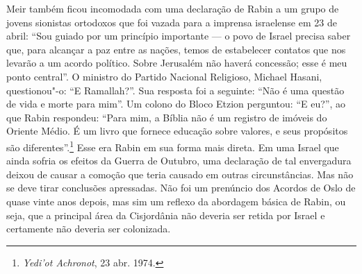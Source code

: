 Meir também ficou incomodada com uma declaração de Rabin a um grupo de
jovens sionistas ortodoxos que foi vazada para a imprensa israelense em
23 de abril: ``Sou guiado por um princípio importante --- o povo de
Israel precisa saber que, para alcançar a paz entre as nações, temos de
estabelecer contatos que nos levarão a um acordo político. Sobre
Jerusalém não haverá concessão; esse é meu ponto central''. O ministro do Partido Nacional Religioso, Michael Hasani, questionou"-o:
``E Ramallah?''. Sua resposta foi a seguinte: ``Não é uma questão de vida e morte para
mim''. Um colono do Bloco Etzion perguntou: ``E eu?'', ao que Rabin
respondeu: ``Para mim, a Bíblia não é um registro de imóveis do Oriente
Médio. É um livro que fornece educação sobre valores, e seus propósitos
são diferentes''.\footnote{\textit{Yedi'ot Achronot}, 23 abr. 1974.} Esse era Rabin em sua forma mais direta. Em
uma Israel que ainda sofria os efeitos da Guerra de Outubro, uma
declaração de tal envergadura deixou de causar a comoção que teria
causado em outras circunstâncias. Mas não se deve tirar conclusões
apressadas. Não foi um prenúncio dos Acordos de Oslo de quase vinte anos
depois, mas sim um reflexo da abordagem básica de Rabin, ou seja, que a
principal área da Cisjordânia não deveria ser retida por Israel e
certamente não deveria ser colonizada.


